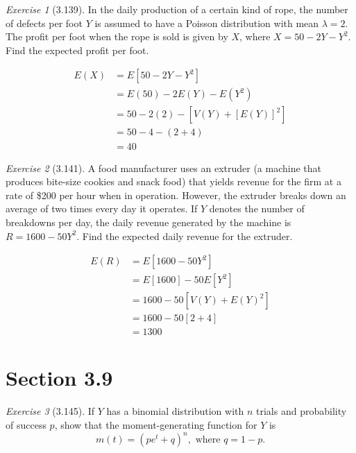 \documentclass[12pt]{amsart}
\makeatletter
\theoremstyle{remark}
\newtheorem*{exercise}{Exercise}%
\renewenvironment{proof}[1][\proofname]{\par\doublespacing
  \pushQED{\qed}%
  \normalfont \topsep6\p@\@plus6\p@\relax
  \list{}{%
    \settowidth{\leftmargin}{\itshape\proofname:\hskip\labelsep}%
    \setlength{\labelwidth}{0pt}%
    \setlength{\itemindent}{-\leftmargin}%
  }%
  \item[\hskip\labelsep\itshape#1\@addpunct{:}]\ignorespaces
}{%
  \popQED\endlist\@endpefalse
  \singlespacing
}
\theoremstyle{mycomment}
\makeatother
\begin{document}
\begin{exercise}[3.139]
In the daily production of a certain kind of rope, the number of defects per foot $Y$ is assumed to have a Poisson distribution with mean $\lambda = 2$. The profit per foot when the rope is sold is given by $X$, where $X = 50 - 2Y - Y^2$. Find the expected profit per foot.

\begin{proof}[Solution]
	\begin{align*}
		E(X) &= E[50 - 2Y - Y^2] \\
			&= E(50) - 2E(Y) - E(Y^2) \\
			&= 50 - 2(2) - [V(Y) + [E(Y)]^2] \\
			&= 50 - 4 - (2 + 4) \\ 
			&= 40
	\end{align*}
\end{proof}
\end{exercise}

\begin{exercise}[3.141]
A food manufacturer uses an extruder (a machine that produces bite-size cookies and snack food) that yields revenue for the firm at a rate of \$200 per hour when in operation. However, the extruder breaks down an average of two times every day it operates. If $Y$ denotes the number of breakdowns per day, the daily revenue generated by the machine is $R = 1600 - 50Y^2$. Find the expected daily revenue for the extruder.

\begin{proof}[Solution]
	\begin{align*}
		E(R) &= E[1600 - 50Y^2] \\
			&= E[1600] - 50E[Y^2] \\
			&= 1600 - 50[V(Y) + E(Y)^2] \\
			&= 1600 - 50[2 + 4] \\
			&= 1300
	\end{align*}
\end{proof}
\end{exercise}
\section*{Section 3.9}

\begin{exercise}[3.145]
If $Y$ has a binomial distribution with $n$ trials and probability of success $p$, show that the moment-generating function for $Y$ is
$$m(t) = (pe^t + q)^n, \text{ where } q = 1 - p.$$

\begin{proof}[Solution]
 
\end{proof}
\end{exercise}
\end{document}
